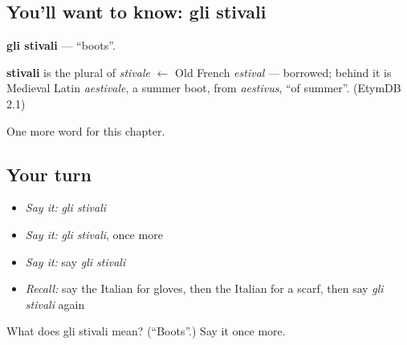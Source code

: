 \subsection*{You'll want to know: gli stivali}
\textbf{gli stivali} — \textquotedblleft{}boots\textquotedblright{}.

\begin{cousinweb}
\textbf{stivali} is the plural of \emph{stivale} $\leftarrow$ Old French \emph{estival} — borrowed; behind it is Medieval Latin \emph{aestivale}, a summer boot, from \emph{aestivus}, \textquotedblleft{}of summer\textquotedblright{}. (EtymDB 2.1)
\end{cousinweb}

\begin{grammarlens}[title={What you've built}]
One more word for this chapter.
\end{grammarlens}

\subsection*{Your turn}
\begin{itemize}
\raggedright
  \item \emph{Say it:} \emph{gli stivali}
  \item \emph{Say it:} \emph{gli stivali}, once more
  \item \emph{Say it:} say \emph{gli stivali}
  \item \emph{Recall:} say the Italian for gloves, then the Italian for a scarf, then say \emph{gli stivali} again
\end{itemize}

\begin{tcolorbox}[breakable,colback=teal!4,colframe=teal!35!black,title={Before you move on}]
What does gli stivali mean? (\textquotedblleft{}Boots\textquotedblright{}.) Say it once more.
\end{tcolorbox}
